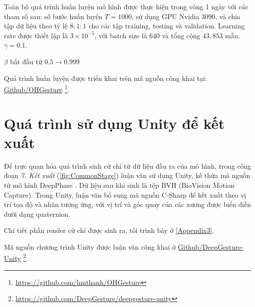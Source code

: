 Toàn bộ quá trình huấn luyện mô hình được thực hiện trong vòng 1 ngày với các tham số sau: số bước huấn luyện $T = 1000$, sử dụng GPU Nvidia 3090, và chia tập dữ liệu theo tỷ lệ $8:1:1$ cho các tập training, testing và validation. Learning rate được thiết lập là $3 \times 10^{-5}$, với batch size là $640$ và tổng cộng $43,853$ mẫu. 
$\gamma = 0.1$.

$\beta$ bắt đầu từ $0.5 \rightarrow 0.999$

Quá trình huấn luyện được triển khai trên mã nguồn công khai tại: \hyperlink{https://github.com/hmthanh/OHGesture}{Github/OHGesture} \footnote{\url{https://github.com/hmthanh/OHGesture}}.


\section{Quá trình sử dụng Unity để kết xuất}
\label{sec:Render}

Để trực quan hóa quá trình sinh cử chỉ từ dữ liệu đầu ra của mô hình, trong công đoạn \textit{7. Kết xuất} (\autoref{fig:CommonStage}) luận văn sử dụng Unity, kế thừa mã nguồn từ mô hình DeepPhase \cite{starke2022deepphase}  . Dữ liệu sau khi sinh là tệp BVH (BioVision Motion Capture). Trong Unity, luận văn bổ sung mã nguồn C-Sharp để kết xuất theo vị trí tọa độ và nhãn tương ứng, với vị trí và góc quay của các xương được biểu diễn dưới dạng quaternion.

Chi tiết phần render cử chỉ được sinh ra, tôi trình bày ở \autoref{Appendix3}.

Mã nguồn chương trình Unity được luận văn công khai ở \hyperlink{https://github.com/DeepGesture/deepgesture-unity}{Github/DeepGesture-Unity}
\footnote{\url{https://github.com/DeepGesture/deepgesture-unity}}.
